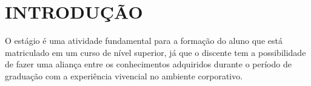 \documentclass[
  12pt,				%
  openany,
  oneside,
  a4paper,			%
  english,			%
  brazil
]{article}
\numberwithin{figure}{section}
\numberwithin{table}{section}
\begin{document}

%
%
%
%
%


%
%
%



\begin{titlepage}

\begin{center}
  \begin{singlespace}
    \tableofcontents
  \end{singlespace}
\end{center}

\end{titlepage}



\section{INTRODUÇÃO}

O estágio é uma atividade fundamental para a formação do aluno que está matriculado em um curso de nível superior, já que o discente tem a possibilidade de fazer uma aliança entre os conhecimentos adquiridos durante o período de graduação com a experiência vivencial no ambiente corporativo. 
\end{document}
